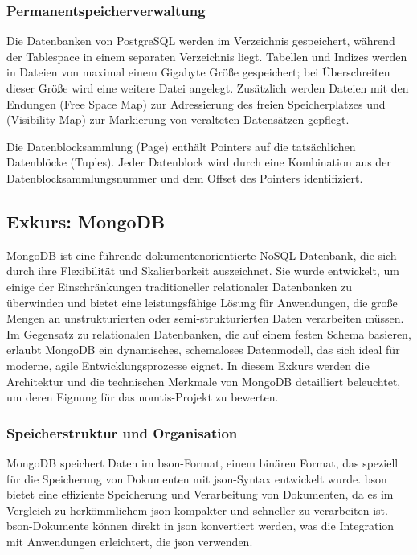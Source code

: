 \subsubsection{Permanentspeicherverwaltung}

Die Datenbanken von PostgreSQL werden im Verzeichnis  gespeichert, während der Tablespace in einem separaten Verzeichnis liegt. Tabellen und Indizes werden in Dateien von maximal einem Gigabyte Größe gespeichert; bei Überschreiten dieser Größe wird eine weitere Datei angelegt. Zusätzlich werden Dateien mit den Endungen  (Free Space Map) zur Adressierung des freien Speicherplatzes und  (Visibility Map) zur Markierung von veralteten Datensätzen gepflegt.

Die Datenblocksammlung (Page) enthält Pointers auf die tatsächlichen Datenblöcke (Tuples). Jeder Datenblock wird durch eine Kombination aus der Datenblocksammlungsnummer und dem Offset des Pointers identifiziert. \cite{Froehlich2022}

\subsection{Exkurs: MongoDB}
MongoDB ist eine führende dokumentenorientierte NoSQL-Datenbank, die sich durch ihre Flexibilität und Skalierbarkeit auszeichnet. Sie wurde entwickelt, um einige der Einschränkungen traditioneller relationaler Datenbanken zu überwinden und bietet eine leistungsfähige Lösung für Anwendungen, die große Mengen an unstrukturierten oder semi-strukturierten Daten verarbeiten müssen. Im Gegensatz zu relationalen Datenbanken, die auf einem festen Schema basieren, erlaubt MongoDB ein dynamisches, schemaloses Datenmodell, das sich ideal für moderne, agile Entwicklungsprozesse eignet. In diesem Exkurs werden die Architektur und die technischen Merkmale von MongoDB detailliert beleuchtet, um deren Eignung für das \ac{nomtis}-Projekt zu bewerten.

\subsubsection{Speicherstruktur und Organisation}
MongoDB speichert Daten im \ac{bson}-Format, einem binären Format, das speziell für die Speicherung von Dokumenten mit \ac{json}-Syntax entwickelt wurde. \ac{bson} bietet eine effiziente Speicherung und Verarbeitung von Dokumenten, da es im Vergleich zu herkömmlichem \ac{json} kompakter und schneller zu verarbeiten ist. \ac{bson}-Dokumente können direkt in \ac{json} konvertiert werden, was die Integration mit Anwendungen erleichtert, die \ac{json} verwenden.


